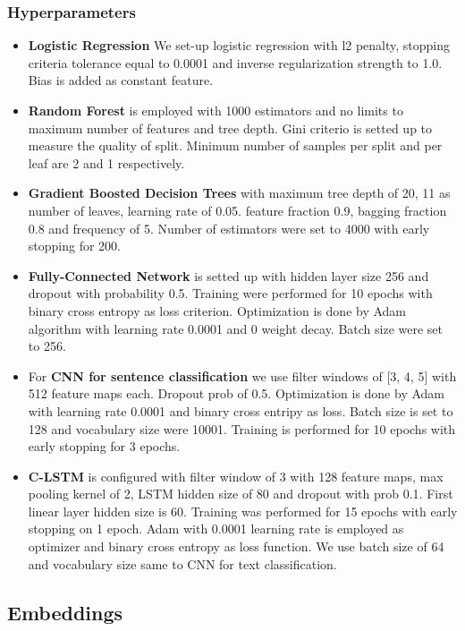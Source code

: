 \documentclass[unicode, 12pt, a4paper,oneside]{article}
\begin{document}
	\subsubsection{Hyperparameters}
		\begin{itemize}
			\item {\bf Logistic Regression} We set-up logistic regression with l2 penalty, stopping criteria tolerance equal to 0.0001 and inverse regularization strength to 1.0. Bias is added as constant feature.
			\item {\bf Random Forest} is employed with 1000 estimators and no limits to maximum number of features and tree depth. Gini criterio is setted up to measure the quality of split. Minimum number of samples per split and per leaf are 2 and 1 respectively.
			\item {\bf Gradient Boosted Decision Trees} with maximum tree depth of 20, 11 as number of leaves, learning rate of 0.05. feature fraction 0.9, bagging fraction 0.8 and frequency of 5. Number of estimators were set to 4000 with early stopping for 200.
			\item {\bf Fully-Connected Network} is setted up with hidden layer size 256 and dropout with probability 0.5. Training were performed for 10 epochs with binary cross entropy as loss criterion. Optimization is done by Adam algorithm with learning rate 0.0001 and 0 weight decay. Batch size were set to 256.
			\item For {\bf CNN for sentence classification} we use filter windows of [3, 4, 5] with 512 feature maps each. Dropout prob of 0.5. Optimization is done by Adam with learning rate 0.0001 and binary cross entripy as loss. Batch size is set to 128 and vocabulary size were 10001. Training is performed for 10 epochs with early stopping for 3 epochs.
			\item {\bf C-LSTM} is configured with filter window of 3 with 128 feature maps, max pooling kernel of 2, LSTM hidden size of 80 and dropout with prob 0.1. First linear layer hidden size is 60. Training was performed for 15 epochs with early stopping on 1 epoch. Adam with 0.0001 learning rate is employed as optimizer and binary cross entropy as loss function. We use batch size of 64 and vocabulary size same to CNN for text classification.
		\end{itemize}

	\subsection{Embeddings}
\end{document}
